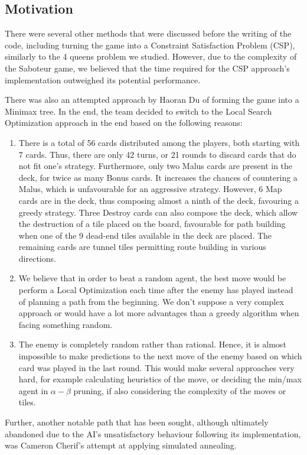 \documentclass[12pt,twoside,letterpaper]{article}
\begin{document}
\subsection{Motivation}
There were several other methods that were discussed before the writing of the code, including turning the game into a Constraint Satisfaction Problem (CSP), similarly to the 4 queens problem we studied. However, due to the complexity of the Saboteur game, we believed that the time required for the CSP approach's implementation outweighed its potential performance.\par
There was also an attempted approach by Haoran Du of forming the game into a Minimax tree. In the end, the team decided to switch to the Local Search Optimization approach in the end based on the following reasons:
\begin{enumerate}
  \item There is a total of 56 cards distributed among the players, both starting with 7 cards. Thus, there are only 42 turns, or 21 rounds to discard cards that do not fit one's strategy. Furthermore, only two Malus cards are present in the deck, for twice as many Bonus cards. It increases the chances of countering a Malus, which is unfavourable for an aggressive strategy. However, 6 Map cards are in the deck, thus composing almost a ninth of the deck, favouring a greedy strategy. Three Destroy cards can also compose the deck, which allow the destruction of a tile placed on the board, favourable for path building when one of the 9 dead-end tiles available in the deck are placed. The remaining cards are tunnel tiles permitting route building in various directions.
  \item We believe that in order to beat a random agent, the best move would be perform a Local Optimization each time after the enemy has played instead of planning a path from the beginning. We don't suppose a very complex approach or would have a lot more advantages than a greedy algorithm when facing something random.
  \item The enemy is completely random rather than rational. Hence, it is almost impossible to make predictions to the next move of the enemy based on which card was played in the last round. This would make several approaches very hard, for example calculating heuristics of the move, or deciding the min/max agent in $\alpha - \beta$ pruning, if also considering the complexity of the moves or tiles.
\end{enumerate}
\par Further, another notable path that has been sought, although ultimately abandoned due to the AI's unsatisfactory behaviour following its implementation, was Cameron Cherif's attempt at applying simulated annealing.\\
\end{document}
